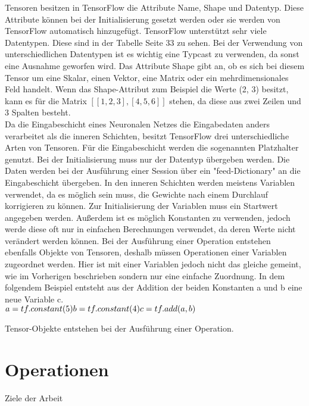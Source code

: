 Tensoren besitzen in TensorFlow die Attribute Name, Shape und Datentyp. Diese Attribute können bei der Initialisierung gesetzt werden oder sie werden von TensorFlow automatisch hinzugefügt. TensorFlow unterstützt sehr viele Datentypen. Diese sind in der Tabelle Seite 33 zu sehen. Bei der Verwendung von unterschiedlichen Datentypen ist es wichtig eine Typcast zu verwenden, da sonst eine Ausnahme geworfen wird. Das Attribute Shape gibt an, ob es sich bei diesem Tensor um eine Skalar, einen Vektor, eine Matrix oder ein mehrdimensionales Feld handelt. Wenn das Shape-Attribut zum Beispiel die Werte (2, 3) besitzt, kann es für die Matrix $\mathit{[[1, 2, 3], [4, 5, 6]]}$ stehen, da diese aus zwei Zeilen und 3 Spalten besteht.\\
Da die Eingabeschicht eines Neuronalen Netzes die Eingabedaten anders verarbeitet als die inneren Schichten, besitzt TensorFlow drei unterschiedliche Arten von Tensoren. Für die Eingabeschicht werden die sogenannten Platzhalter genutzt. Bei der Initialisierung muss nur der Datentyp übergeben werden. Die Daten werden bei der Ausführung einer Session über ein "feed-Dictionary"  an die Eingabeschicht übergeben. In den inneren Schichten werden meistens Variablen verwendet, da es möglich sein muss, die Gewichte nach einem Durchlauf korrigieren zu können. Zur Initialisierung der Variablen muss ein Startwert angegeben werden. Außerdem ist es möglich Konstanten zu verwenden, jedoch werde diese oft nur in einfachen Berechnungen verwendet, da deren Werte nicht verändert werden können.
Bei der Ausführung einer Operation entstehen ebenfalls Objekte von Tensoren, deshalb müssen Operationen einer Variablen zugeordnet werden. Hier ist mit einer Variablen jedoch nicht das gleiche gemeint, wie im Vorherigen beschrieben sondern nur eine einfache Zuordnung. In dem folgendem Beispiel entsteht aus der Addition der beiden Konstanten a und b eine neue Variable c.\\
\begin{math}
a = tf.constant(5)\\ b = tf.constant(4)\\ c = tf.add(a, b)    
\end{math}

Tensor-Objekte entstehen bei der Ausführung einer Operation.



\section{Operationen}
\label{sec:operationen}
\printsubchapterauthor{\authorMarco}
Ziele der Arbeit

